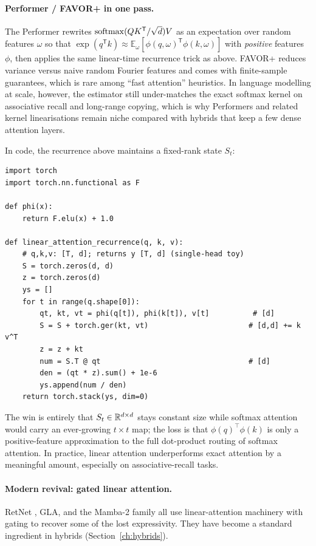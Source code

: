 \paragraph{Performer / FAVOR+ in one pass.}
The Performer \citep{choromanski2021performer} rewrites
\(\operatorname{softmax}(QK^{\mathsf T}/\sqrt{d})V\) as an expectation over random
features \(\omega\) so that
\(\exp(q^{\mathsf T}k) \approx \mathbb{E}_\omega[\phi(q,\omega)^{\mathsf T}\phi(k,\omega)]\)
with \emph{positive} features \(\phi\), then applies the same linear-time
recurrence trick as above. FAVOR+ reduces variance versus naive random
Fourier features and comes with finite-sample guarantees, which is rare
among ``fast attention'' heuristics. In language modelling at scale,
however, the estimator still under-matches the exact softmax kernel on
associative recall and long-range copying, which is why Performers and
related kernel linearisations remain niche compared with hybrids that
keep a few dense attention layers.

In code, the recurrence above maintains a fixed-rank state \(S_t\):

\begin{lstlisting}[caption={Linear attention via kernel feature map \(\phi\) \citep{katharopoulos2020linear}; state \(S_t\) has fixed rank.}]
import torch
import torch.nn.functional as F

def phi(x):
    return F.elu(x) + 1.0

def linear_attention_recurrence(q, k, v):
    # q,k,v: [T, d]; returns y [T, d] (single-head toy)
    S = torch.zeros(d, d)
    z = torch.zeros(d)
    ys = []
    for t in range(q.shape[0]):
        qt, kt, vt = phi(q[t]), phi(k[t]), v[t]          # [d]
        S = S + torch.ger(kt, vt)                       # [d,d] += k v^T
        z = z + kt
        num = S.T @ qt                                  # [d]
        den = (qt * z).sum() + 1e-6
        ys.append(num / den)
    return torch.stack(ys, dim=0)
\end{lstlisting}

\noindent
The win is entirely that \(S_t \in \mathbb{R}^{d\times d}\) stays constant size
while softmax attention would carry an ever-growing \(t\times t\) map;
the loss is that \(\phi(q)^\top \phi(k)\) is only a positive-feature
approximation to the full dot-product routing of softmax attention. In
practice, linear attention underperforms exact attention by a meaningful
amount, especially on associative-recall tasks.

\paragraph{Modern revival: gated linear attention.} RetNet
\citep{sun2023retnet}, GLA, and the Mamba-2 family all use
linear-attention machinery with gating to recover some of the lost
expressivity. They have become a standard ingredient in hybrids
(Section~\ref{ch:hybrids}).


